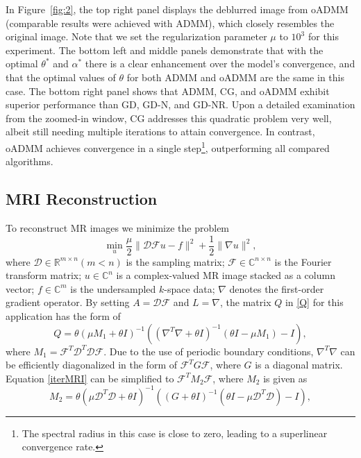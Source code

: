 \documentclass[letterpaper]{article} %
\begin{document}
In Figure~\ref{fig:2}, the top right panel displays the deblurred image from oADMM (comparable results were achieved with ADMM), which closely resembles the original image. Note that we set the regularization parameter $\mu$ to $10^3$ for this experiment. The bottom left and middle panels demonstrate that with the optimal $\theta^*$ and $\alpha^*$ there is a clear enhancement over the model's convergence, and that the optimal values of $\theta$ for both ADMM and oADMM are the same in this case. The bottom right panel shows that ADMM, CG, and oADMM exhibit superior performance than GD, GD-N, and GD-NR. Upon a detailed examination from the zoomed-in window, CG addresses this quadratic problem very well, albeit still needing multiple iterations to attain convergence. In contrast, oADMM achieves convergence in a single step\footnote{The spectral radius in this case is close to zero, leading to a superlinear convergence rate.}, outperforming all compared algorithms. 

\subsection{MRI Reconstruction}  
To reconstruct MR images we minimize the problem
\begin{equation}\label{MRIt2}
	\min\limits_{u}\frac{\mu}{2}\|\mathcal{D} \mathcal{F}u-f\|^2+\frac{1}{2}\|\nabla u\|^2,
\end{equation}
where $\mathcal{D}\in\mathbb{R}^{m\times n} \left(m<n\right)$ is the sampling matrix; $\mathcal{F}\in\mathbb{C}^{n\times n}$ is the Fourier transform matrix; $u\in\mathbb{C}^{n}$ is a complex-valued MR image stacked as a column vector; $f\in\mathbb{C}^{m}$  is the undersampled $k$-space data; $\nabla$ denotes the first-order gradient operator.
By setting $A=\mathcal{D} \mathcal{F}$ and $L=\nabla$, the matrix $Q$ in \eqref{Q} for this application has the form of
\begin{equation}\label{iterMRI}
	 Q=\theta(\mu M_1 +\theta I)^{-1} ( ( {\nabla^T}\nabla +\theta I)^{-1} (\theta I - \mu M_1  ) - I),
\end{equation}
where $M_1=\mathcal{F}^T \mathcal{D}^T \mathcal{D} \mathcal{F}$. Due to the use of periodic boundary conditions, $\nabla^T\nabla$ can be efficiently diagonalized in the form of $\mathcal{F}^T G \mathcal{F}$, where $G$ is a diagonal matrix. Equation \eqref{iterMRI} can be simplified to $\mathcal{F}^T M_2 \mathcal{F}$, where $M_2$ is given as
\begin{equation*}\label{iterdeblurring}
	 M_2 = \theta(\mu \mathcal{D}^T \mathcal{D}+\theta I)^{-1} ( ( G +\theta I)^{-1} (\theta I -  \mu \mathcal{D}^T \mathcal{D} ) - I),
\end{equation*}
\end{document}
